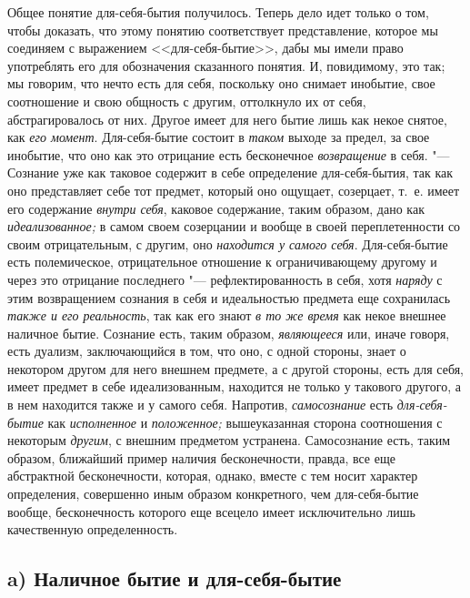 Общее понятие для-себя-бытия получилось. Теперь дело идет только о том,
чтобы доказать, что этому понятию соответствует представление, которое мы
соединяем с выражением <<для-себя-бытие>>, дабы мы имели право употреблять
его для обозначения сказанного понятия. И, повидимому, это так; мы говорим,
что нечто есть для себя, поскольку оно снимает инобытие, свое соотношение и
свою общность с другим, оттолкнуло их от себя, абстрагировалось от них.
Другое имеет для него бытие лишь как некое снятое, как
{\em его момент}. Для-себя-бытие состоит в
{\em таком} выходе за предел, за свое инобытие, что оно
как это отрицание есть бесконечное {\em возвращение} в
себя. "--- Сознание уже как таковое содержит в себе определение
для-себя-бытия, так как оно представляет себе тот предмет, который оно
ощущает, созерцает, т.~е. имеет его содержание
{\em внутри себя}, каковое содержание, таким образом,
дано как {\em идеализованное;} в самом своем созерцании
и вообще в своей переплетенности со своим отрицательным, с другим, оно
{\em находится у самого себя}. Для-себя-бытие есть
полемическое, отрицательное отношение к ограничивающему другому и через это
отрицание последнего "--- рефлектированность в себя, хотя
{\em наряду} с этим возвращением сознания в себя и
идеальностью предмета еще сохранилась {\em также и его
реальность}, так как его знают {\em в то же время} как
некое внешнее наличное бытие. Сознание есть, таким образом,
{\em являющееся} или, иначе говоря, есть дуализм,
заключающийся в том, что оно, с одной стороны, знает о некотором другом для
него внешнем предмете, а с другой стороны, есть для себя, имеет предмет в
себе идеализованным, находится не только у такового другого, а в нем
находится также и у самого себя. Напротив, {\em самосознание} есть
{\em для-себя-бытие} как {\em исполненное} и
{\em положенное;} вышеуказанная сторона соотношения с
некоторым {\em другим}, с внешним предметом устранена.
Самосознание есть, таким образом, ближайший пример наличия бесконечности,
правда, все еще абстрактной бесконечности, которая, однако, вместе с тем
носит характер определения, совершенно иным образом конкретного, чем
для-себя-бытие вообще, бесконечность которого еще всецело имеет
исключительно лишь качественную определенность.

\subsection[a) Наличное бытие и для-себя-бытие]{a) Наличное бытие и для-себя-бытие}

